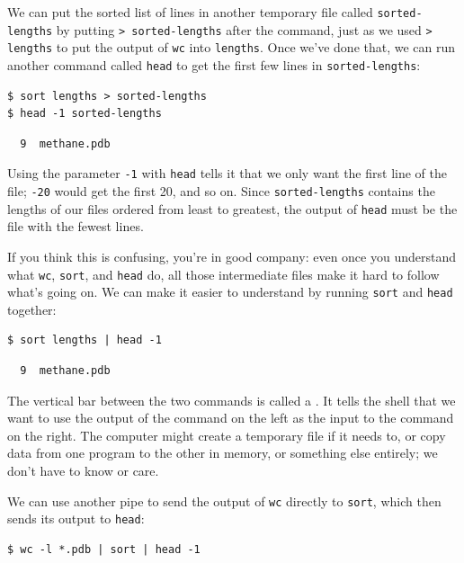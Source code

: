 \documentclass{book}
\begin{document}
We can put the sorted list of lines in another temporary file called
\texttt{sorted-lengths} by putting
\texttt{\textgreater{} sorted-lengths} after the command, just as we
used \texttt{\textgreater{} lengths} to put the output of \texttt{wc}
into \texttt{lengths}. Once we've done that, we can run another command
called \texttt{head} to get the first few lines in
\texttt{sorted-lengths}:

\begin{verbatim}
$ sort lengths > sorted-lengths
$ head -1 sorted-lengths
\end{verbatim}

\begin{verbatim}
  9  methane.pdb
\end{verbatim}

Using the parameter \texttt{-1} with \texttt{head} tells it that we only
want the first line of the file; \texttt{-20} would get the first 20,
and so on. Since \texttt{sorted-lengths} contains the lengths of our
files ordered from least to greatest, the output of \texttt{head} must
be the file with the fewest lines.

If you think this is confusing, you're in good company: even once you
understand what \texttt{wc}, \texttt{sort}, and \texttt{head} do, all
those intermediate files make it hard to follow what's going on. We can
make it easier to understand by running \texttt{sort} and \texttt{head}
together:

\begin{verbatim}
$ sort lengths | head -1
\end{verbatim}

\begin{verbatim}
  9  methane.pdb
\end{verbatim}

The vertical bar between the two commands is called a
. It tells the shell that we want to use the
output of the command on the left as the input to the command on the
right. The computer might create a temporary file if it needs to, or
copy data from one program to the other in memory, or something else
entirely; we don't have to know or care.

We can use another pipe to send the output of \texttt{wc} directly to
\texttt{sort}, which then sends its output to \texttt{head}:

\begin{verbatim}
$ wc -l *.pdb | sort | head -1
\end{verbatim}
\end{document}
